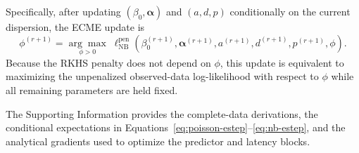 Specifically, after updating
$(\beta_0,\bm{\alpha})$ and $(a,d,p)$ conditionally on the current
dispersion, the ECME update is
\begin{equation}
    \phi^{(r+1)}
    =
    \underset{\phi>0}{\arg\max}
    \;
    \ell^{\mathrm{pen}}_{\mathrm{NB}}
    \left(
        \beta_0^{(r+1)},
        \bm{\alpha}^{(r+1)},
        a^{(r+1)},
        d^{(r+1)},
        p^{(r+1)},
        \phi
    \right).
    \label{eq:nb-ecme-phi-update}
\end{equation}
Because the RKHS penalty does not depend on $\phi$, this update is
equivalent to maximizing the unpenalized observed-data log-likelihood
with respect to $\phi$ while all remaining parameters are held fixed.

The Supporting Information provides the complete-data derivations,
the conditional expectations in
Equations~\eqref{eq:poisson-estep}--\eqref{eq:nb-estep}, and the
analytical gradients used to optimize the predictor and latency
blocks.

